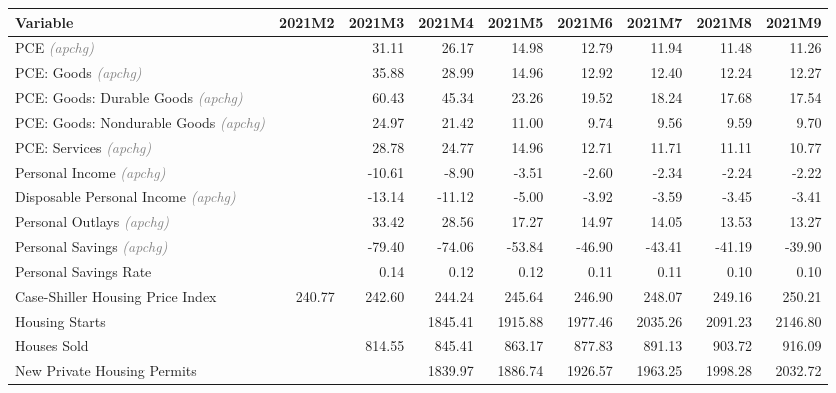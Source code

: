 \documentclass[11pt, letterpaper]{article}\usepackage[]{graphicx}\usepackage[]{color}
\begin{document}
\begin{table}[H]
\centering
\begingroup\fontsize{10pt}{12pt}\selectfont
\begin{tabular}{lrrrrrrrr}
  \hline
Variable & 2021M2 & 2021M3 & 2021M4 & 2021M5 & 2021M6 & 2021M7 & 2021M8 & 2021M9 \\ 
  \hline
PCE \textit{\footnotesize\textcolor{gray}{(apchg)}} &  & 31.11 & 26.17 & 14.98 & 12.79 & 11.94 & 11.48 & 11.26 \\ 
  PCE: Goods \textit{\footnotesize\textcolor{gray}{(apchg)}} &  & 35.88 & 28.99 & 14.96 & 12.92 & 12.40 & 12.24 & 12.27 \\ 
  PCE: Goods: Durable Goods \textit{\footnotesize\textcolor{gray}{(apchg)}} &  & 60.43 & 45.34 & 23.26 & 19.52 & 18.24 & 17.68 & 17.54 \\ 
  PCE: Goods: Nondurable Goods \textit{\footnotesize\textcolor{gray}{(apchg)}} &  & 24.97 & 21.42 & 11.00 & 9.74 & 9.56 & 9.59 & 9.70 \\ 
  PCE: Services \textit{\footnotesize\textcolor{gray}{(apchg)}} &  & 28.78 & 24.77 & 14.96 & 12.71 & 11.71 & 11.11 & 10.77 \\ 
  Personal Income \textit{\footnotesize\textcolor{gray}{(apchg)}} &  & -10.61 & -8.90 & -3.51 & -2.60 & -2.34 & -2.24 & -2.22 \\ 
  Disposable Personal Income \textit{\footnotesize\textcolor{gray}{(apchg)}} &  & -13.14 & -11.12 & -5.00 & -3.92 & -3.59 & -3.45 & -3.41 \\ 
  Personal Outlays \textit{\footnotesize\textcolor{gray}{(apchg)}} &  & 33.42 & 28.56 & 17.27 & 14.97 & 14.05 & 13.53 & 13.27 \\ 
  Personal Savings \textit{\footnotesize\textcolor{gray}{(apchg)}} &  & -79.40 & -74.06 & -53.84 & -46.90 & -43.41 & -41.19 & -39.90 \\ 
  Personal Savings Rate &  & 0.14 & 0.12 & 0.12 & 0.11 & 0.11 & 0.10 & 0.10 \\ 
  Case-Shiller Housing Price Index & 240.77 & 242.60 & 244.24 & 245.64 & 246.90 & 248.07 & 249.16 & 250.21 \\ 
  Housing Starts &  &  & 1845.41 & 1915.88 & 1977.46 & 2035.26 & 2091.23 & 2146.80 \\ 
  Houses Sold &  & 814.55 & 845.41 & 863.17 & 877.83 & 891.13 & 903.72 & 916.09 \\ 
  New Private Housing Permits &  &  & 1839.97 & 1886.74 & 1926.57 & 1963.25 & 1998.28 & 2032.72 \\ 

\end{tabular}
\end{table}
\end{document}
